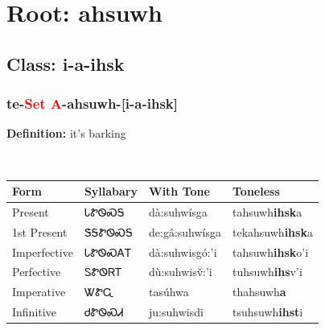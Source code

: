 \needspace{4in}
\section*{Root: ahsuwh}
\nopagebreak
{}
\needspace{3in}
\subsection*{Class: i-a-ihsk}
\nopagebreak
\needspace{2in}
\subsubsection*{te{-}\textcolor{Red}{Set A}{-}\textbf{ahsuwh}{-}[i-a-ihsk]}
\nopagebreak
\textbf{Definition: } it{\textquoteright}s barking
\\[0.5em]
\begin{tabularx}{\textwidth}{l X X X}%
\toprule%
\textbf{Form}&\textbf{Syllabary}&\textbf{With Tone}&\textbf{Toneless}\\%
\midrule%
Present&ᏓᏑᏫᏍᎦ&dà:suhwísga&tahsuwh\textbf{ihsk}a\\%
1st Present&ᏕᎦᏑᏫᏍᎦ&de:gâ:suhwísga&tekahsuwh\textbf{ihsk}a\\%
Imperfective&ᏓᏑᏫᏍᎪᎢ&dà:suhwisgó:’i&tahsuwh\textbf{ihsk}o'i\\%
Perfective&ᏚᏑᏫᏒᎢ&dù:suhwisv̌:’i&tuhsuwh\textbf{ihs}v'i\\%
Imperative&ᏔᏑᏩ&tasúhwa&thahsuwh\textbf{a}\\%
Infinitive&ᏧᏑᏫᏍᏗ&ju:suhwisdi&tsuhsuwh\textbf{ihst}i\\%
\bottomrule%
\end{tabularx}
\\[1em]